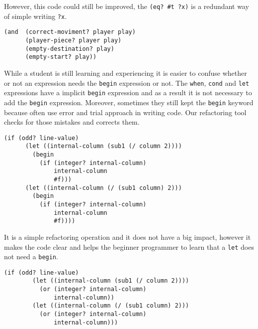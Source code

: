However, this code could still be improved, the {\tt (eq? \#t ?x)} is a redundant way
of simple writing {\tt ?x}.
\begin{lstlisting}[basicstyle=\ttfamily]
(and  (correct-moviment? player play)
      (player-piece? player play)
      (empty-destination? play)
      (empty-start? play))
\end{lstlisting}


While a student is still learning and experiencing it is easier to confuse whether
or not an expression needs the {\tt begin} expression or not.
The {\tt when}, {\tt cond} and {\tt let} expressions have a implicit {\tt begin} expression and
as a result it is not necessary to add the {\tt begin} expression.
Moreover, sometimes they still kept the {\tt begin} keyword because often use error and trial approach
in writing code.
Our refactoring tool checks for those mistakes and corrects them.
\begin{lstlisting}[basicstyle=\ttfamily]
  (if (odd? line-value)
      (let ((internal-column (sub1 (/ column 2))))
        (begin
          (if (integer? internal-column)
              internal-column
              #f)))
      (let ((internal-column (/ (sub1 column) 2)))
        (begin
          (if (integer? internal-column)
              internal-column
              #f))))
\end{lstlisting}
It is a simple refactoring operation and it does not have a big impact, however
it makes the code clear and helps the beginner programmer to learn that a {\tt let}
does not need a {\tt begin}.
\begin{lstlisting}[basicstyle=\ttfamily]
  (if (odd? line-value)
        (let ((internal-column (sub1 (/ column 2))))
          (or (integer? internal-column)
              internal-column))
        (let ((internal-column (/ (sub1 column) 2)))
          (or (integer? internal-column)
              internal-column)))
\end{lstlisting}


